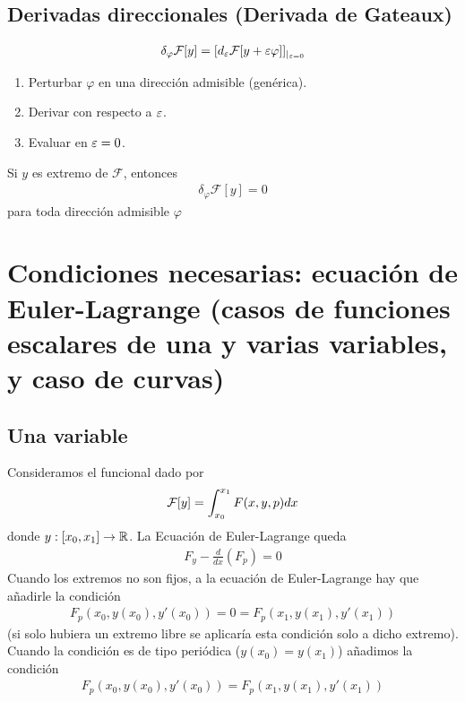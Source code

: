 \documentclass[12pt]{book}
\begin{document}
    \subsection{Derivadas direccionales (Derivada de Gateaux)}
    \begin{gather*}
        \delta_\varphi \mathcal{F}[y] = [d_\varepsilon \mathcal{F}[y+\varepsilon \varphi]]_{|_{\varepsilon = 0}}
    \end{gather*}
    \begin{enumerate}
        \item Perturbar $\varphi$ en una dirección admisible (genérica).
        \item Derivar con respecto a $\varepsilon$.
        \item Evaluar en $\varepsilon=0$.
    \end{enumerate}
    Si $y$ es extremo de $\mathcal F$, entonces
    \begin{align*}
        \delta_\varphi \mathcal F[y]=0
    \end{align*}
    para toda dirección admisible $\varphi$

    \section{Condiciones necesarias: ecuación de Euler-Lagrange (casos de funciones escalares de una y varias variables, y caso de curvas)}


    \subsection{Una variable}
    Consideramos el funcional dado por 
    \begin{gather*}
        \mathcal{F}[y] = \int_{x_0}^{x_1} F(x,y,p) dx
    \end{gather*}
    donde $y:[x_0, x_1]\to \mathbb{R}$. La Ecuación de Euler-Lagrange queda
    \begin{gather*}
        F_y -\frac{d}{dx}(F_p) = 0
    \end{gather*}
    Cuando los extremos no son fijos, a la ecuación de Euler-Lagrange hay que añadirle la condición
    \begin{gather*}
        F_p(x_0,y(x_0), y'(x_0)) = 0 = F_p(x_1,y(x_1), y'(x_1))
    \end{gather*}
    (si solo hubiera un extremo libre se aplicaría esta condición solo a dicho extremo).
    Cuando la condición es de tipo periódica ($y(x_0)=y(x_1)$) añadimos la condición
    \begin{gather*}
        F_p(x_0,y(x_0), y'(x_0)) = F_p(x_1,y(x_1), y'(x_1))
    \end{gather*}
\end{document}

